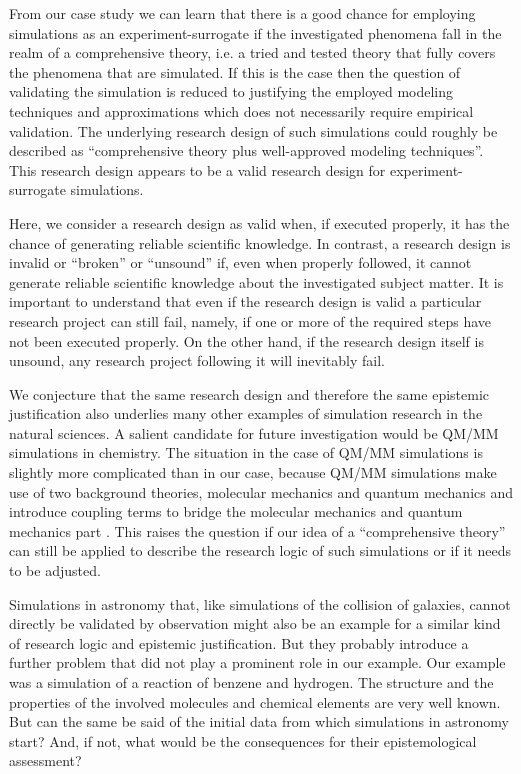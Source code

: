 \documentclass[12pt, a4paper]{article}
\numberwithin{equation}{section}
\begin{document}
From our case study we can learn that there is a good chance for
employing simulations as an experiment-surrogate if the investigated
phenomena fall in the realm of a comprehensive theory, i.e. a tried
and tested theory that fully covers the phenomena that are
simulated. If this is the case then the question of validating the
simulation is reduced to justifying the employed modeling techniques
and approximations which does not necessarily require empirical
validation. The underlying research design of such simulations could
roughly be described as ``comprehensive theory plus well-approved
modeling techniques''. This research design appears to be a valid
research design for experiment-surrogate simulations.

Here, we consider a research design as valid when, if executed
properly, it has the chance of generating reliable scientific
knowledge. In contrast, a research design is invalid or ``broken'' or
``unsound'' if, even when properly followed, it cannot generate
reliable scientific knowledge about the investigated subject
matter. It is important to understand that even if the research design
is valid a particular research project can still fail, namely, if one
or more of the required steps have not been executed properly. On the
other hand, if the research design itself is unsound, any research
project following it will inevitably fail.

We conjecture that the same research design and therefore the same
epistemic justification also underlies many other examples of
simulation research in the natural sciences. A salient candidate for
future investigation would be QM/MM simulations in chemistry. The
situation in the case of QM/MM simulations is slightly more
complicated than in our case, because QM/MM simulations make use of
two background theories, molecular mechanics and quantum mechanics and
introduce coupling terms to bridge the molecular mechanics and quantum
mechanics part \citep{senn-thiel:2009}. This raises the question if
our idea of a ``comprehensive theory'' can still be applied to
describe the research logic of such simulations or if it needs to be
adjusted.

Simulations in astronomy that, like simulations of the collision of
galaxies, cannot directly be validated by observation might also be an
example for a similar kind of research logic and epistemic
justification. But they probably introduce a further problem that did
not play a prominent role in our example. Our example was a simulation
of a reaction of benzene and hydrogen. The structure and the
properties of the involved molecules and chemical elements are very
well known. But can the same be said of the initial data from which
simulations in astronomy start? And, if not, what would be the
consequences for their epistemological assessment?
\end{document}
